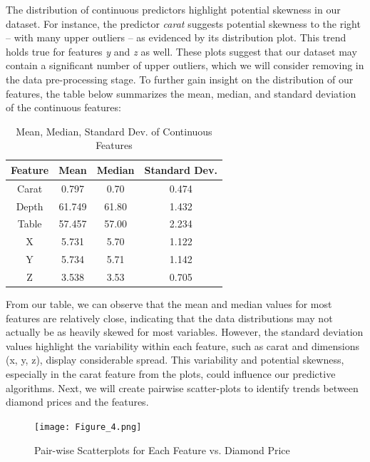 \documentclass[conference]{IEEEtran}
\begin{document}
The distribution of continuous predictors highlight potential skewness in our dataset. For instance, the predictor \emph{carat} suggests potential skewness to the right – with many upper outliers – as evidenced by its distribution plot. This trend holds true for features \emph{y} and \emph{z} as well. These plots suggest that our dataset may contain a significant number of upper outliers, which we will consider removing in the data pre-processing stage. To further gain insight on the distribution of our features, the table below summarizes the mean, median, and standard deviation of the continuous features:

\begin{table}[H]
    \centering
    \caption{Mean, Median, Standard Dev. of Continuous Features}
    \label{tab:example_table}
    \begin{tabular}{|c|c|c|c|}
        \hline
        Feature & Mean & Median & Standard Dev. \\
        \hline
        Carat & 0.797 & 0.70 & 0.474 \\
        \hline
        Depth & 61.749 & 61.80  & 1.432 \\
        \hline
        Table & 57.457 & 57.00 & 2.234 \\
        \hline
        X & 5.731 & 5.70 & 1.122 \\
        \hline
        Y & 5.734 & 5.71 & 1.142 \\
        \hline
        Z & 3.538 & 3.53 & 0.705 \\
        \hline
    \end{tabular}
\end{table}

From our table, we can observe that the mean and median values for most features are relatively close, indicating that the data distributions may not actually be as heavily skewed for most variables. However, the standard deviation values highlight the variability within each feature, such as carat and dimensions (x, y, z), display considerable spread. This variability and potential skewness, especially in the carat feature from the plots, could influence our predictive algorithms. Next, we will create pairwise scatter-plots to identify trends between diamond prices and the features.

\begin{figure}[H]
    \centering
    \texttt{[image: Figure\_4.png]} %
    \caption{Pair-wise Scatterplots for Each Feature vs. Diamond Price}
    \label{fig:image_label}
\end{figure}
\end{document}
